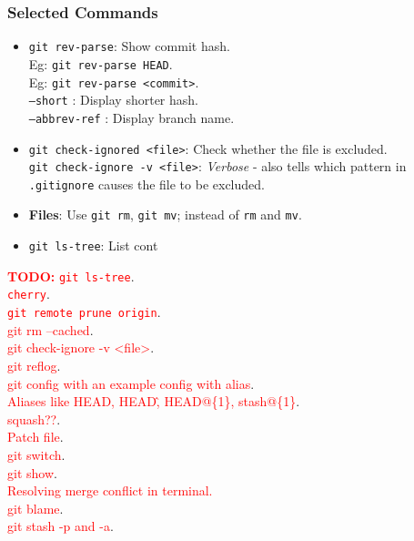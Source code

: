 \subsubsection*{Selected Commands}
\begin{itemize}
\item \texttt{git rev-parse}: Show commit hash.\\
        Eg: \texttt{git rev-parse HEAD}.\\
        Eg: \texttt{git rev-parse <commit>}.\\
        \texttt{--short} : Display shorter hash.\\
        \texttt{--abbrev-ref} : Display branch name.\\
\item \texttt{git check-ignored <file>}: Check whether the file is excluded.\\
        \texttt{git check-ignore -v <file>}:
            \textit{Verbose} - also tells which pattern in \texttt{.gitignore}
            causes the file to be excluded.\\
\item \textbf{Files}: Use \texttt{git rm}, \texttt{git mv}; instead of 
        \texttt{rm} and \texttt{mv}.\\
\item \texttt{git ls-tree}: List cont
\end{itemize}

\textbf{\textcolor{red}{TODO:}} 
\textcolor{red}{\texttt{git ls-tree}}.\\
\textcolor{red}{\texttt{cherry}}. \\
\textcolor{red}{\texttt{git remote prune origin}}.\\
\textcolor{red}{git rm --cached}.\\
\textcolor{red}{git check-ignore -v <file>}.\\
\textcolor{red}{git reflog}.\\
\textcolor{red}{git config with an example config with alias}. \\
\textcolor{red}{Aliases like HEAD, HEAD\^, HEAD@\{1\}, stash@\{1\}}.\\
\textcolor{red}{squash??}.\\
\textcolor{red}{Patch file}.\\
\textcolor{red}{git switch}.\\
\textcolor{red}{git show}.\\
\textcolor{red}{Resolving merge conflict in terminal.}\\
\textcolor{red}{git blame}.\\
\textcolor{red}{git stash -p and -a}.\\
\columnbreak

